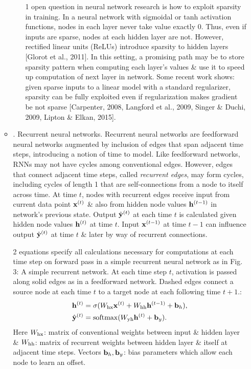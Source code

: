 \documentclass{article}
\begin{document}
\begin{enumerate}
\begin{itemize}
\begin{itemize}
			1 open question in neural network research is how to exploit sparsity in training. In a neural network with sigmoidal or tanh activation functions, nodes in each layer never take value exactly 0. Thus, even if inputs are sparse, nodes at each hidden layer are not. However, rectified linear units (ReLUs) introduce sparsity to hidden layers [Glorot et al., 2011]. In this setting, a promising path may be to store sparsity pattern when computing each layer's values \& use it to speed up computation of next layer in network. Some recent work shows: given sparse inputs to a linear model with a standard regularizer, sparsity can be fully exploited even if regularization makes gradient be not sparse [Carpenter, 2008, Langford et al., 2009, Singer \& Duchi, 2009, Lipton \& Elkan, 2015].
		\end{itemize}
		\item {. Recurrent neural networks.} Recurrent neural networks are feedforward neural networks augmented by inclusion of edges that span adjacent time steps, introducing a notion of time to model. Like feedforward networks, RNNs may not have cycles among conventional edges. However, edges that connect adjacent time steps, called {\it recurrent edges}, may form cycles, including cycles of length 1 that are self-connections from a node to itself across time. At time $t$, nodes with recurrent edges receive input from current data point ${\bf x}^{(t)}$ \& also from hidden node values ${\bf h}^{(t - 1)}$ in network's previous state. Output $\hat{\bf y}^{(t)}$ at each time $t$ is calculated given hidden node values ${\bf h}^{(t)}$ at time $t$. Input ${\bf x}^{(t - 1)}$ at time $t - 1$ can influence output $\hat{\bf y}^{(t)}$ at time $t$ \& later by way of recurrent connections.
		
		2 equations specify all calculations necessary for computations at each time step on forward pass in a simple recurrent neural network as in {\sf Fig. 3: A simple recurrent network. At each time step $t$, activation is passed along solid edges as in a feedforward network. Dashed edges connect a source node at each time $t$ to a target node at each following time $t + 1$.}:
		\begin{align}
			{\bf h}^{(t)} &= \sigma(W_{\rm hx}{\bf x}^{(t)} + W_{\rm hh}{\bf h}^{(t - 1)} + {\bf b}_h),\\
			\hat{\bf y}^{(t)} &= {\rm softmax}(W_{\rm yh}{\bf h}^{(t)} + {\bf b}_y).
		\end{align}
		Here $W_{\rm hx}$: matrix of conventional weights between input \& hidden layer \& $W_{\rm hh}$: matrix of recurrent weights between hidden layer \& itself at adjacent time steps. Vectors ${\bf b}_h,{\bf b}_y$: bias parameters which allow each node to learn an offset.
		

\end{itemize}
\end{enumerate}
\end{document}
